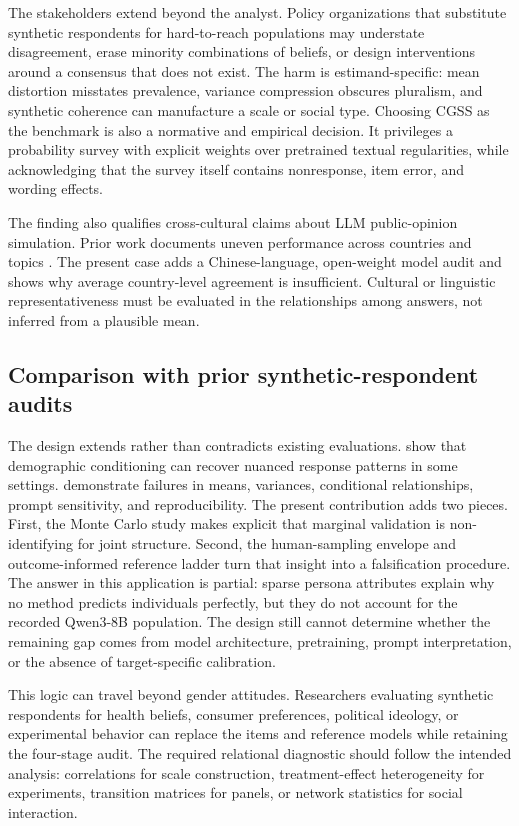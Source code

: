 \documentclass[10pt,twocolumn]{article}
\newcommand{\CGSS}{CGSS\xspace}
\begin{document}
The stakeholders extend beyond the analyst. Policy organizations that substitute synthetic
respondents for hard-to-reach populations may understate disagreement, erase minority combinations
of beliefs, or design interventions around a consensus that does not exist. The harm is
estimand-specific: mean distortion misstates prevalence, variance compression obscures pluralism,
and synthetic coherence can manufacture a scale or social type. Choosing \CGSS as the benchmark is
also a normative and empirical decision. It privileges a probability survey with explicit weights
over pretrained textual regularities, while acknowledging that the survey itself contains
nonresponse, item error, and wording effects.

The finding also qualifies cross-cultural claims about LLM public-opinion simulation. Prior work
documents uneven performance across countries and topics \parencite{qu2024performance}. The present
case adds a Chinese-language, open-weight model audit and shows why average country-level agreement
is insufficient. Cultural or linguistic representativeness must be evaluated in the relationships
among answers, not inferred from a plausible mean.

\subsection{Comparison with prior synthetic-respondent audits}

The design extends rather than contradicts existing evaluations. \textcite{argyle2023one} show that
demographic conditioning can recover nuanced response patterns in some settings.
\textcite{bisbee2024synthetic} demonstrate failures in means, variances, conditional relationships,
prompt sensitivity, and reproducibility. The present contribution adds two pieces. First, the
Monte Carlo study makes explicit that marginal validation is non-identifying for joint structure.
Second, the human-sampling envelope and outcome-informed reference ladder turn that insight into a
falsification procedure. The answer in this application is partial: sparse persona attributes
explain why no method predicts individuals perfectly, but they do not account for the recorded
Qwen3-8B population. The design still cannot determine whether the remaining gap comes from model
architecture, pretraining, prompt interpretation, or the absence of target-specific calibration.

This logic can travel beyond gender attitudes. Researchers evaluating synthetic respondents for
health beliefs, consumer preferences, political ideology, or experimental behavior can replace the
items and reference models while retaining the four-stage audit. The required relational diagnostic
should follow the intended analysis: correlations for scale construction, treatment-effect
heterogeneity for experiments, transition matrices for panels, or network statistics for social
interaction.
\end{document}
